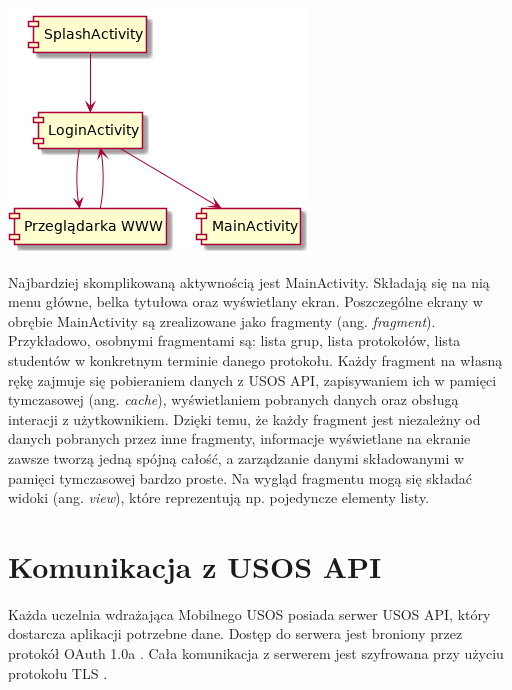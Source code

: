 \documentclass{pracamgr}
\begin{document}
\begingroup
\centering
\includegraphics[scale=0.5]{img/activities.png}
\label{fig:activities}
\medskip
\endgroup

Najbardziej skomplikowaną aktywnością jest MainActivity. Składają się na nią
menu główne, belka tytułowa oraz wyświetlany ekran. Poszczególne ekrany w obrębie
MainActivity są zrealizowane jako fragmenty (ang. \textit{fragment}). Przykładowo,
osobnymi fragmentami są: lista grup, lista protokołów, lista studentów w konkretnym
terminie danego protokołu. Każdy fragment na własną rękę zajmuje się pobieraniem
danych z USOS API, zapisywaniem ich w pamięci tymczasowej (ang. \textit{cache}),
wyświetlaniem pobranych danych oraz obsługą interacji z użytkownikiem. Dzięki temu,
że każdy fragment jest niezależny od danych pobranych przez inne fragmenty, informacje
wyświetlane na ekranie zawsze tworzą jedną spójną całość, a zarządzanie danymi
składowanymi w pamięci tymczasowej bardzo proste. Na wygląd fragmentu mogą się
składać widoki (ang. \textit{view}), które reprezentują np. pojedyncze elementy
listy.

\section{Komunikacja z USOS API}

Każda uczelnia wdrażająca Mobilnego USOS posiada serwer USOS API, który dostarcza
aplikacji potrzebne dane. Dostęp do serwera jest broniony przez protokół
OAuth 1.0a \cite{oauth}. Cała komunikacja z serwerem jest szyfrowana przy użyciu
protokołu TLS \cite{tls12}.
\end{document}
